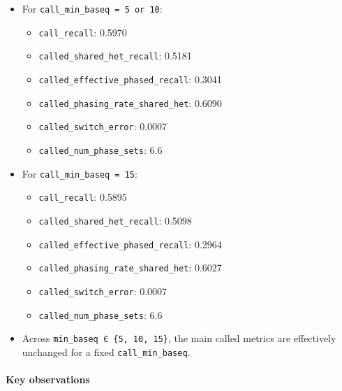 \documentclass[
]{article}
\providecommand{\tightlist}{%
  \setlength{\itemsep}{0pt}\setlength{\parskip}{0pt}}
\begin{document}
\begin{itemize}
\tightlist
\item
  For \texttt{call\_min\_baseq\ =\ 5\ or\ 10}:

  \begin{itemize}
  \tightlist
  \item
    \texttt{call\_recall}: 0.5970
  \item
    \texttt{called\_shared\_het\_recall}: 0.5181
  \item
    \texttt{called\_effective\_phased\_recall}: 0.3041
  \item
    \texttt{called\_phasing\_rate\_shared\_het}: 0.6090
  \item
    \texttt{called\_switch\_error}: 0.0007
  \item
    \texttt{called\_num\_phase\_sets}: 6.6
  \end{itemize}
\item
  For \texttt{call\_min\_baseq\ =\ 15}:

  \begin{itemize}
  \tightlist
  \item
    \texttt{call\_recall}: 0.5895
  \item
    \texttt{called\_shared\_het\_recall}: 0.5098
  \item
    \texttt{called\_effective\_phased\_recall}: 0.2964
  \item
    \texttt{called\_phasing\_rate\_shared\_het}: 0.6027
  \item
    \texttt{called\_switch\_error}: 0.0007
  \item
    \texttt{called\_num\_phase\_sets}: 6.6
  \end{itemize}
\item
  Across \texttt{min\_baseq\ ∈\ \{5,\ 10,\ 15\}}, the main called
  metrics are effectively unchanged for a fixed
  \texttt{call\_min\_baseq}.
\end{itemize}

\paragraph{Key observations}\label{key-observations-13}
\end{document}
